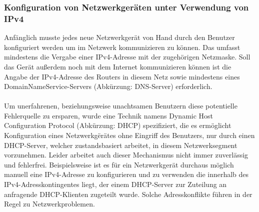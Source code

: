 \documentclass[a4paper,12pt]{scrartcl}
\begin{document}
\subsubsection{Konfiguration von Netzwerkger\"aten  unter Verwendung von IPv4}

Anf\"anglich musste jedes neue Netzwerkger\"at von Hand durch den Benutzer konfiguriert werden um im Netzwerk kommunizieren zu k\"onnen. Das umfasst mindestens die Vergabe einer IPv4-Adresse mit der zugeh\"origen Netzmaske. Soll das Ger\"at au\ss{}erdem noch mit dem Internet kommunizieren k\"onnen ist die Angabe der IPv4-Adresse des Routers in diesem Netz sowie mindestens eines DomainNameService-Servers (Abk\"urzung: DNS-Server) erforderlich.\\
\\
Um unerfahrenen, beziehungsweise unachtsamen Benutzern diese potentielle Fehlerquelle zu ersparen, wurde eine Technik namens Dynamic Host Configuration Protocol (Abk\"urzung: DHCP) \cite[RFC2131]{RFC2131} spezifiziert, die es erm\"oglicht Konfiguration eines Netzwerkg\"er\"ates ohne Eingriff des Benutzers, nur durch einen DHCP-Server, welcher zustandsbasiert arbeitet,  in diesem Netzwerksegment vorzunehmen. Leider arbeitet auch dieser Mechanismus nicht immer zuverl\"assig und fehlerfrei. Beispielsweise ist es f\"ur ein Netzwerkger\"at durchaus m\"oglich manuell eine IPv4-Adresse zu konfigurieren und zu verwenden die innerhalb des IPv4-Adresskontingentes liegt, der einem DHCP-Server zur Zuteilung an anfragende DHCP-Klienten zugeteilt wurde. Solche Adresskonflikte f\"uhren in der Regel zu Netzwerkproblemen.
\end{document}
